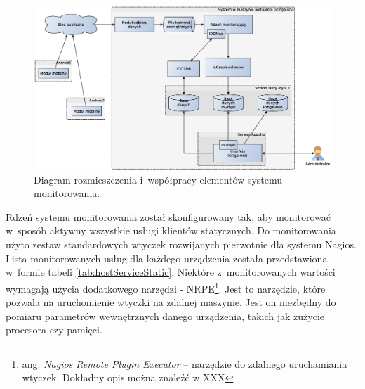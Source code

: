 \begin{figure}[ht]
  \caption{Diagram rozmieszczenia i~współpracy elementów systemu
    monitorowania.}
 \label{fig:deployment}
\includegraphics[width=1\textwidth]{img/deployment}
\end{figure}

Rdzeń systemu monitorowania został skonfigurowany tak, aby monitorować
w~sposób aktywny wszystkie usługi klientów statycznych. Do
monitorowania użyto zestaw standardowych wtyczek rozwijanych
pierwotnie dla systemu Nagios. Lista monitorowanych usług dla każdego
urządzenia została przedstawiona w~formie tabeli
\ref{tab:hostServiceStatic}. Niektóre z~monitorowanych wartości
wymagają użycia dodatkowego narzędzi - NRPE\footnote{ang. {\em Nagios
    Remote Plugin Executor} -- narzędzie do zdalnego uruchamiania
  wtyczek. Dokładny opis można znaleźć w XXX}. Jest to narzędzie,
które pozwala na uruchomienie wtyczki na zdalnej maszynie. Jest on
niezbędny do pomiaru parametrów wewnętrznych danego urządzenia, takich
jak zużycie procesora czy pamięci.

